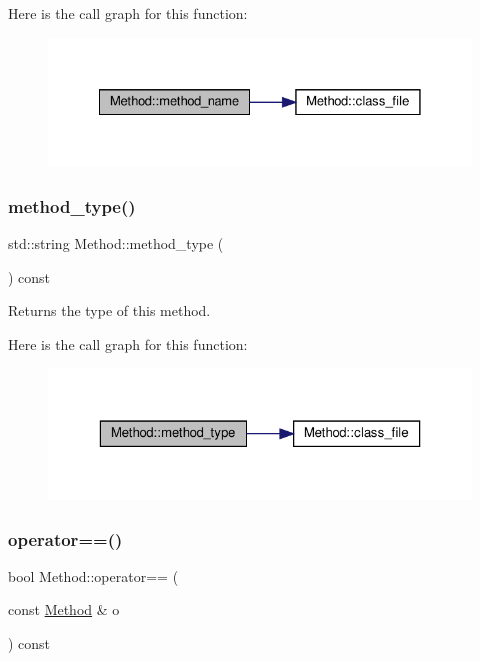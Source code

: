 Here is the call graph for this function\+:\nopagebreak
\begin{figure}[H]
\begin{center}
\leavevmode
\includegraphics[width=328pt]{classMethod_ab0855cbda89f070acc27ebff025ffd15_cgraph}
\end{center}
\end{figure}
\mbox{\label{classMethod_a86015f24da420dc7502bdac6138a4a47}} 
\subsubsection{\texorpdfstring{method\+\_\+type()}{method\_type()}}
{\footnotesize\ttfamily std\+::string Method\+::method\+\_\+type (\begin{DoxyParamCaption}{ }\end{DoxyParamCaption}) const}



Returns the type of this method. 

Here is the call graph for this function\+:\nopagebreak
\begin{figure}[H]
\begin{center}
\leavevmode
\includegraphics[width=323pt]{classMethod_a86015f24da420dc7502bdac6138a4a47_cgraph}
\end{center}
\end{figure}
\mbox{\label{classMethod_afa02f09f3037782d08463433465181b6}} 
\subsubsection{\texorpdfstring{operator==()}{operator==()}}
{\footnotesize\ttfamily bool Method\+::operator== (\begin{DoxyParamCaption}\item[{const \hyperlink{classMethod}{Method} \&}]{o }\end{DoxyParamCaption}) const}


